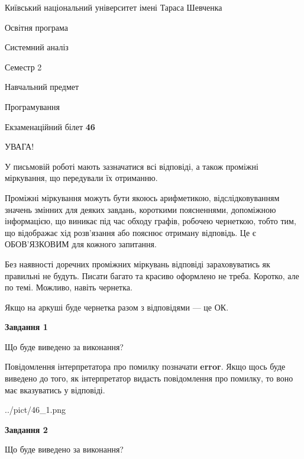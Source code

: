 \documentclass[12pt, ukrainian]{article}
\begin{document}
{{\begin {small}\par
{ \center  Київський національний університет імені Тараса Шевченка \par}
{\parbox {5 cm}{Освітня програма \hfill}{\parbox {7 cm}{Системний аналіз \hfill}}\parbox {6 cm}{\hfill Семестр 2}}\par
{\parbox {5 cm} {Навчальний предмет \hfill}\parbox {7 cm}{Програмування \hfill}\parbox {6cm}{\hfill}\par}\vspace{-7pt} \end{small}}{\center Екзаменаційний білет \No \textbf
{ 46 }\par}}
{
\begin {large}
УВАГА!

У письмовій роботі мають зазначатися всі відповіді, а також проміжні міркування, що передували їх отриманню.

Проміжні міркування можуть бути якоюсь арифметикою, відслідковуванням зна\-чень змінних для деяких завдань,
короткими поясненнями, допоміжною інформацією, що виникає під час обходу графів, робочею чернеткою,
тобто тим, що відображає хід розв’язання або пояснює отриману відповідь.
Це є ОБОВ’ЯЗКОВИМ для кожного запитання.

Без наявності доречних проміжних міркувань відповіді зараховуватись як правиль\-ні не будуть.
Писати багато та красиво оформлено не треба. Коротко, але по темі. Можли\-во, навіть чернетка.

Якщо на аркуші буде чернетка разом з відповідями --- це ОК.

\newpage

{\begin {center}\textbf{Завдання 1}\end {center}}\par
Що буде виведено за виконання?

Повідомлення інтерпретатора про помилку позначати \textbf{error}.
Якщо щось буде виведено до того, як інтерпретатор видасть повідомлення про помилку, 
то воно має вказуватись у відповіді. \par


\begin{center}
	{../pict/46_1.png}
\end{center}
\newpage

{\begin {center}\textbf{Завдання 2}\end {center}}\par
Що буде виведено за виконання?


\end{large}}
\end{document}
